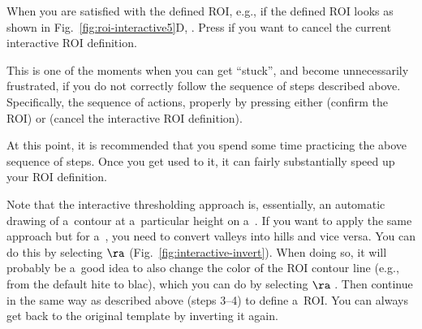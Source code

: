 \s When you are satisfied with the defined ROI, e.g., if the defined ROI looks as shown in Fig.~\ref{fig:roi-interactive5}D, . Press  if you want to cancel the current interactive ROI definition.

\bul This is one of the moments when you can get ``stuck'', and become unnecessarily frustrated, if you do not correctly follow the sequence of steps described above. Specifically,  the  sequence of actions,  properly by pressing either  (confirm the ROI) or  (cancel the interactive ROI definition). 

\s At this point, it is recommended that you spend some time practicing the above sequence of steps. Once you get used to it, it can fairly substantially speed up your ROI definition.

\s Note that the interactive thresholding approach is, essentially, an automatic drawing of a~contour at a~particular height on a~. If you want to apply the same approach but for a~, you need to convert valleys into hills and vice versa. You can do this by selecting  $\ra$  (Fig.~\ref{fig:interactive-invert}). When doing so, it will probably be a~good idea to also change the color of the ROI contour line (e.g., from the default hite to blac), which you can do by selecting  $\ra$ . Then continue in the same way as described above (steps 3--4) to define a~ROI. You can always get back to the original template by inverting it again.

